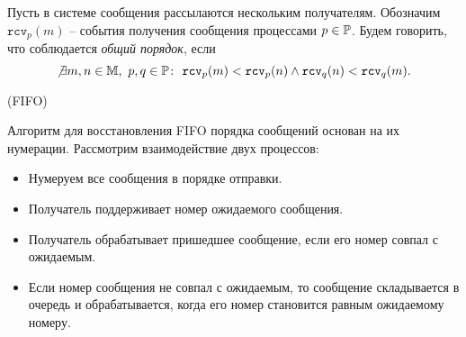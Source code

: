 \begin{definition}
    Пусть в системе сообщения рассылаются нескольким получателям.
    Обозначим $\texttt{rcv}_p(m)$ -- события получения сообщения процессами
    $p \in \mathbb{P}$. Будем говорить, что соблюдается \textit{общий порядок},
    если
    \[
        \not\exists m,n \in \mathbb{M},~ p,q \in \mathbb{P}\colon~
        \texttt{rcv}_p(m) < \texttt{rcv}_p(n) \wedge
        \texttt{rcv}_q(n) < \texttt{rcv}_q(m)
    .\]
\end{definition}

\begin{algorithm}(FIFO)

    Алгоритм для восстановления FIFO порядка сообщений основан на их нумерации. Рассмотрим взаимодействие двух процессов:
    \begin{itemize}
        \item Нумеруем все сообщения в порядке отправки.
        \item Получатель поддерживает номер ожидаемого сообщения.
        \item Получатель обрабатывает пришедшее сообщение, если его номер совпал с ожидаемым.
        \item Если номер сообщения не совпал с ожидаемым, то сообщение 
            складывается в очередь и обрабатывается, когда его номер становится 
            равным ожидаемому номеру.
    \end{itemize}
\end{algorithm}
